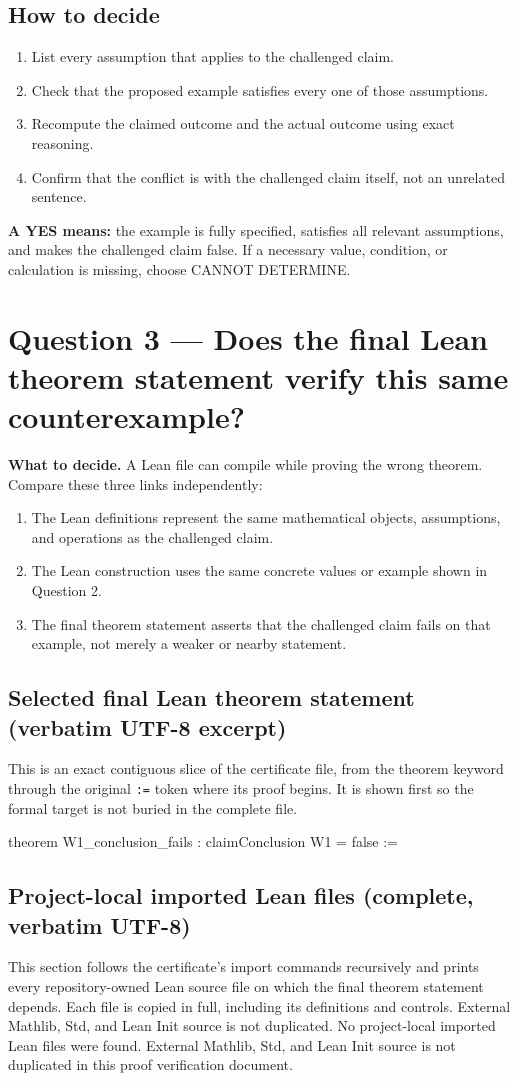 \documentclass[11pt]{article}
\begin{document}
\subsection*{How to decide}
\begin{enumerate}
\item List every assumption that applies to the challenged claim.
\item Check that the proposed example satisfies every one of those assumptions.
\item Recompute the claimed outcome and the actual outcome using exact reasoning.
\item Confirm that the conflict is with the challenged claim itself, not an unrelated sentence.
\end{enumerate}
\textbf{A YES means:} the example is fully specified, satisfies all relevant assumptions, and makes the challenged claim false. If a necessary value, condition, or calculation is missing, choose CANNOT DETERMINE.
\section*{Question 3 --- Does the final Lean theorem statement verify this same counterexample?}
\textbf{What to decide.} A Lean file can compile while proving the wrong theorem. Compare these three links independently:
\begin{enumerate}
\item The Lean definitions represent the same mathematical objects, assumptions, and operations as the challenged claim.
\item The Lean construction uses the same concrete values or example shown in Question 2.
\item The final theorem statement asserts that the challenged claim fails on that example, not merely a weaker or nearby statement.
\end{enumerate}
\subsection*{Selected final Lean theorem statement (verbatim UTF-8 excerpt)}
This is an exact contiguous slice of the certificate file, from the theorem keyword through the original \texttt{:=} token where its proof begins. It is shown first so the formal target is not buried in the complete file.
\begin{Vlean}
theorem W1_conclusion_fails : claimConclusion W1 = false :=
\end{Vlean}
\subsection*{Project-local imported Lean files (complete, verbatim UTF-8)}
This section follows the certificate's import commands recursively and prints every repository-owned Lean source file on which the final theorem statement depends. Each file is copied in full, including its definitions and controls. External Mathlib, Std, and Lean Init source is not duplicated.
No project-local imported Lean files were found. External Mathlib, Std, and Lean Init source is not duplicated in this proof verification document.
\end{document}
